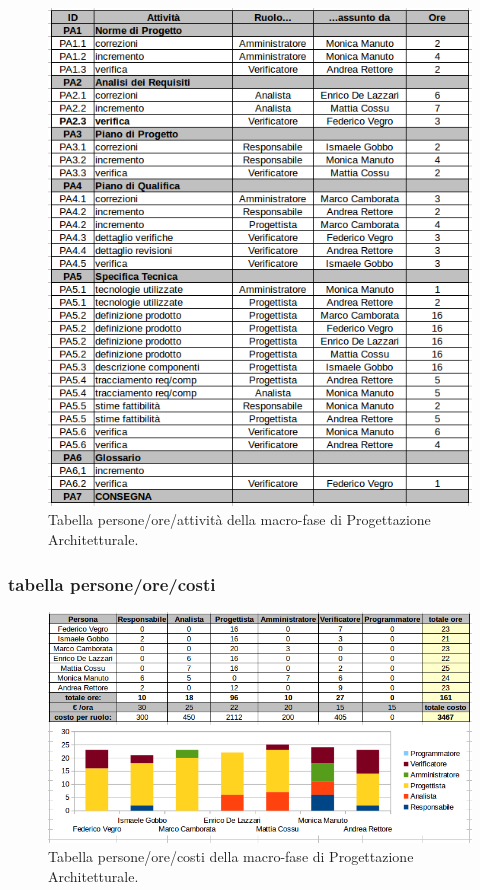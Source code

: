 \begin{figure}[h]
\begin{center}
\includegraphics[scale=0.65]{img/progarc-attivita.png}
\caption{Tabella persone/ore/attività della macro-fase di Progettazione Architetturale.}
\end{center}
\end{figure}
\clearpage

\subsubsection{tabella persone/ore/costi}

\begin{figure}[h]
\begin{center}
\includegraphics[width=\textwidth, height=\textheight, keepaspectratio]{img/progarc-personeorecosti.png}
\caption{Tabella persone/ore/costi della macro-fase di Progettazione Architetturale.}
\end{center}
\end{figure}


